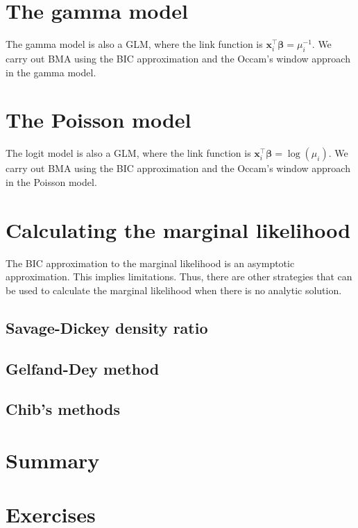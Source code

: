 \section{The gamma model}\label{sec10_4}
The gamma model is also a GLM, where the link function is $\bm{x}_i^{\top}\bm{\beta}=\mu_i^{-1}$.
We carry out BMA using the BIC approximation and the Occam's window approach in the gamma model.

\section{The Poisson model}\label{sec10_5}
The logit model is also a GLM, where the link function is $\bm{x}_i^{\top}\bm{\beta}=\log(\mu_i)$.
We carry out BMA using the BIC approximation and the Occam's window approach in the Poisson model.


\section{Calculating the marginal likelihood}\label{sec10_6}

The BIC approximation to the marginal likelihood is an asymptotic approximation. This implies limitations. Thus, there are other strategies that can be used to calculate the marginal likelihood when there is no analytic solution.

\subsection{Savage-Dickey density ratio}\label{sec10_11}

\subsection{Gelfand-Dey method}\label{sec10_12}

\subsection{Chib's methods}\label{sec10_13}

\section{Summary}\label{sec10_7}

\section{Exercises}\label{sec10_8}

